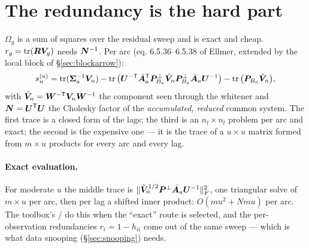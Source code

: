 \section{The redundancy is the hard part}
\label{sec:redundancy}

$\Omega_g$ is a sum of squares over the residual sweep and is exact and cheap. $r_g = \operatorname{tr}(\bm{R}\bm{V}_g)$ needs $\bm{N}^{-1}$. Per arc (eq. 6.5.36--6.5.38 of Ellmer, extended by the local block of \S\ref{sec:blockarrow}):
\begin{equation}
s_n^{(a)} = \operatorname{tr}(\bm{\Sigma}_a^{-1}\bm{V}_n) - \operatorname{tr}\big(\bm{U}^{-\mathsf T}\bar{\bm{A}}_a^{\mathsf T}\bm{P}^\perp_{B_a}\tilde{\bm{V}}_n\bm{P}^\perp_{B_a}\bar{\bm{A}}_a\bm{U}^{-1}\big) - \operatorname{tr}\big(\bm{P}_{B_a}\tilde{\bm{V}}_n\big),
\label{eq:sn}
\end{equation}
with $\tilde{\bm{V}}_n = \bm{W}^{-\mathsf T}\bm{V}_n\bm{W}^{-1}$ the component seen through the whitener and $\bm{N} = \bm{U}^{\mathsf T}\bm{U}$ the Cholesky factor of the \emph{accumulated, reduced} common system. The first trace is a closed form of the lags; the third is an $n_l\times n_l$ problem per arc and exact; the second is the expensive one --- it is the trace of a $u\times u$ matrix formed from $m\times u$ products for every arc and every lag.

\paragraph{Exact evaluation.} For moderate $u$ the middle trace is $\|\tilde{\bm{V}}_n^{1/2}\bm{P}^\perp\bar{\bm{A}}_a\bm{U}^{-1}\|_F^2$, one triangular solve of $m\times u$ per arc, then per lag a shifted inner product: $O(m u^2 + N m u)$ per arc. The toolbox's  /  do this when the ``exact'' route is selected, and the per-observation redundancies $r_i = 1 - h_{ii}$ come out of the same sweep --- which is what data snooping (\S\ref{sec:snooping}) needs.

